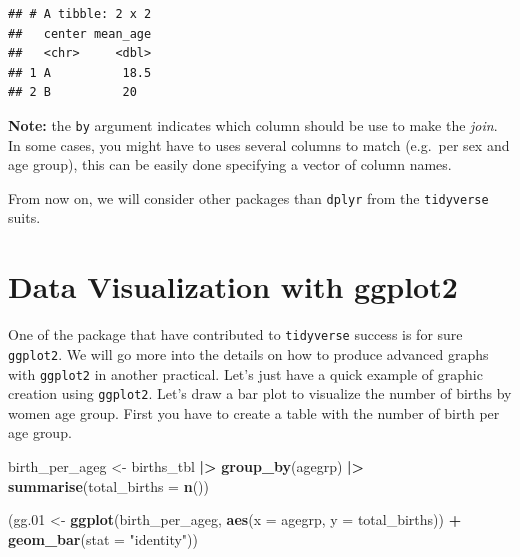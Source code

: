 \documentclass[
]{book}
\newenvironment{Shaded}{\begin{snugshade}}{\end{snugshade}}
\newcommand{\AttributeTok}[1]{\textcolor[rgb]{0.13,0.29,0.53}{#1}}
\newcommand{\FloatTok}[1]{\textcolor[rgb]{0.00,0.00,0.81}{#1}}
\newcommand{\FunctionTok}[1]{\textcolor[rgb]{0.13,0.29,0.53}{\textbf{#1}}}
\newcommand{\NormalTok}[1]{#1}
\newcommand{\OtherTok}[1]{\textcolor[rgb]{0.56,0.35,0.01}{#1}}
\newcommand{\SpecialCharTok}[1]{\textcolor[rgb]{0.81,0.36,0.00}{\textbf{#1}}}
\newcommand{\StringTok}[1]{\textcolor[rgb]{0.31,0.60,0.02}{#1}}
\theoremstyle{definition}
\theoremstyle{definition}
\theoremstyle{definition}
\theoremstyle{definition}
\theoremstyle{remark}
\begin{document}
\begin{verbatim}
## # A tibble: 2 x 2
##   center mean_age
##   <chr>     <dbl>
## 1 A          18.5
## 2 B          20
\end{verbatim}

\textbf{Note:} the \texttt{by} argument indicates which column should be use to make the \emph{join}. In some
cases, you might have to uses several columns to match (e.g.~per sex and age group), this
can be easily done specifying a vector of column names.

From now on, we will consider other packages than \texttt{dplyr} from the \texttt{tidyverse} suits.

\section{Data Visualization with ggplot2}\label{data-visualization-with-ggplot2}

One of the package that have contributed to \texttt{tidyverse} success is for sure \texttt{ggplot2}.
We will go more into the details on how to produce advanced graphs with \texttt{ggplot2} in another practical.
Let's just have a quick example of graphic creation using \texttt{ggplot2}.
Let's draw a bar plot to visualize the number of births by women age group.
First you have to create a table with the number of birth per age group.

\begin{Shaded}
\begin{Highlighting}[]
\NormalTok{birth\_per\_ageg }\OtherTok{\textless{}{-}}\NormalTok{ births\_tbl }\SpecialCharTok{|\textgreater{}}
  \FunctionTok{group\_by}\NormalTok{(agegrp) }\SpecialCharTok{|\textgreater{}}
  \FunctionTok{summarise}\NormalTok{(}\AttributeTok{total\_births =} \FunctionTok{n}\NormalTok{())}
\end{Highlighting}
\end{Shaded}

\begin{Shaded}
\begin{Highlighting}[]
\NormalTok{(gg}\FloatTok{.01} \OtherTok{\textless{}{-}}
  \FunctionTok{ggplot}\NormalTok{(birth\_per\_ageg, }\FunctionTok{aes}\NormalTok{(}\AttributeTok{x =}\NormalTok{ agegrp, }\AttributeTok{y =}\NormalTok{ total\_births)) }\SpecialCharTok{+}
  \FunctionTok{geom\_bar}\NormalTok{(}\AttributeTok{stat =} \StringTok{"identity"}\NormalTok{))}
\end{Highlighting}
\end{Shaded}
\end{document}
